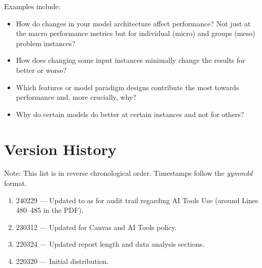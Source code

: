 \documentclass[11pt]{article}
\begin{document}
\begin{enumerate}
    Examples include:
    \begin{itemize}
        \item How do changes in your model architecture affect performance?  Not just at the macro performance metrics but for individual (micro) and groups (meso) problem instances?
        \item How does changing some input instances minimally change the results for better or worse?
        \item Which features or model paradigm designs contribute the most towards performance and, more crucially, why?
        \item Why do certain models do better at certain instances and not for others?
    \end{itemize}
    
\end{enumerate}

\section{Version History}

Note: This list is in reverse chronological order.  Timestamps follow the {\it yymmdd} format.
\begin{enumerate}
    \item 240229 --- Updated to as for audit trail regarding AI Tools Use (around Lines 480--485 in the PDF). 
    \item 230312 --- Updated for Canvas and AI Tools policy.
    \item 220324 --- Updated report length and data analysis sections.
    \item 220320 --- Initial distribution.
\end{enumerate}
\end{document}
